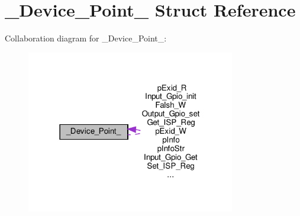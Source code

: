 \hypertarget{struct___device___point__}{}\section{\+\_\+\+Device\+\_\+\+Point\+\_\+ Struct Reference}
\label{struct___device___point__}


Collaboration diagram for \+\_\+\+Device\+\_\+\+Point\+\_\+\+:
\nopagebreak
\begin{figure}[H]
\begin{center}
\leavevmode
\includegraphics[width=258pt]{struct___device___point____coll__graph}
\end{center}
\end{figure}
